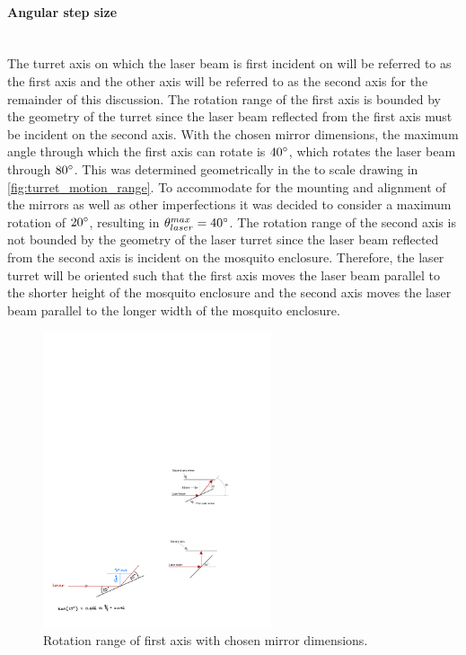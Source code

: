 \paragraph{Angular step size}\mbox{}\\
The turret axis on which the laser beam is first incident on will be referred to as the first axis and the other axis will be referred to as the second axis for the remainder of this discussion. The rotation range of the first axis is bounded by the geometry of the turret since the laser beam reflected from the first axis must be incident on the second axis. With the chosen mirror dimensions, the maximum angle through which the first axis can rotate is $40^{\circ}$, which rotates the laser beam through $80^{\circ}$. This was determined geometrically in the to scale drawing in \autoref{fig:turret_motion_range}. To accommodate for the mounting and alignment of the mirrors as well as other imperfections it was decided to consider a maximum rotation of $20^{\circ}$, resulting in $\theta_{laser}^{max} = 40^{\circ}$. The rotation range of the second axis is not bounded by the geometry of the laser turret since the laser beam reflected from the second axis is incident on the mosquito enclosure. Therefore, the laser turret will be oriented such that the first axis moves the laser beam parallel to the shorter height of the mosquito enclosure and the second axis moves the laser beam parallel to the longer width of the mosquito enclosure.
\begin{figure}[h]
    \centering
    \includegraphics[width=0.6\textwidth]{figures/hardware_design/rotation_range_of_first_axis.pdf}
    \caption{Rotation range of first axis with chosen mirror dimensions.}
    \label{fig:turret_motion_range}
\end{figure}

